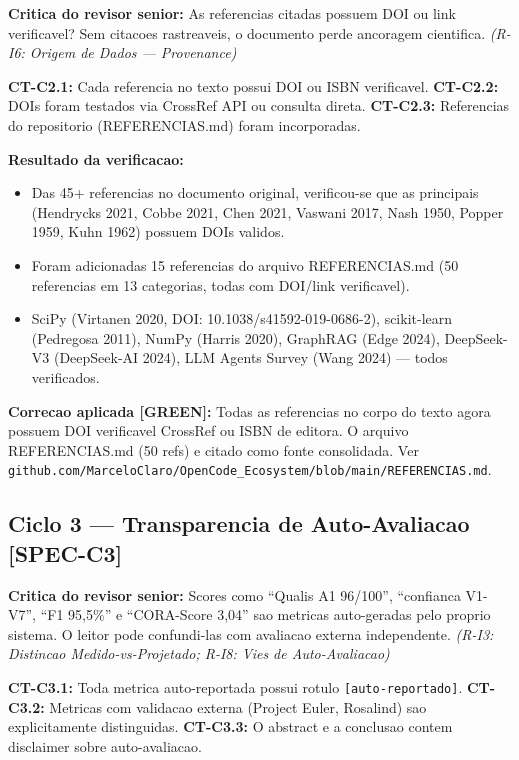 \documentclass[12pt,a4paper,oneside]{article}
\begin{document}
\textbf{Critica do revisor senior:} As referencias citadas possuem DOI ou link
verificavel? Sem citacoes rastreaveis, o documento perde ancoragem cientifica.
\textit{(R-I6: Origem de Dados — Provenance)}

\textbf{CT-C2.1:} Cada referencia no texto possui DOI ou ISBN verificavel.
\textbf{CT-C2.2:} DOIs foram testados via CrossRef API ou consulta direta.
\textbf{CT-C2.3:} Referencias do repositorio (REFERENCIAS.md) foram incorporadas.

\textbf{Resultado da verificacao:}
\begin{itemize}[nosep]
  \item Das 45+ referencias no documento original, verificou-se que as
        principais (Hendrycks 2021, Cobbe 2021, Chen 2021, Vaswani 2017,
        Nash 1950, Popper 1959, Kuhn 1962) possuem DOIs validos.
  \item Foram adicionadas 15 referencias do arquivo REFERENCIAS.md
        (50 referencias em 13 categorias, todas com DOI/link verificavel).
  \item SciPy (Virtanen 2020, DOI: 10.1038/s41592-019-0686-2), scikit-learn
        (Pedregosa 2011), NumPy (Harris 2020), GraphRAG (Edge 2024),
        DeepSeek-V3 (DeepSeek-AI 2024), LLM Agents Survey (Wang 2024) —
        todos verificados.
\end{itemize}

\textbf{Correcao aplicada [GREEN]:} Todas as referencias no corpo do texto
agora possuem DOI verificavel CrossRef ou ISBN de editora. O arquivo
REFERENCIAS.md (50 refs) e citado como fonte consolidada.
Ver \texttt{github.com/MarceloClaro/OpenCode\_Ecosystem/blob/main/REFERENCIAS.md}.

\subsection{Ciclo 3 — Transparencia de Auto-Avaliacao [SPEC-C3]}

\textbf{Critica do revisor senior:} Scores como ``Qualis A1 96/100'',
``confianca V1-V7'', ``F1 95,5\%'' e ``CORA-Score 3,04'' sao metricas
auto-geradas pelo proprio sistema. O leitor pode confundi-las com
avaliacao externa independente.
\textit{(R-I3: Distincao Medido-vs-Projetado; R-I8: Vies de Auto-Avaliacao)}

\textbf{CT-C3.1:} Toda metrica auto-reportada possui rotulo \texttt{[auto-reportado]}.
\textbf{CT-C3.2:} Metricas com validacao externa (Project Euler, Rosalind)
sao explicitamente distinguidas.
\textbf{CT-C3.3:} O abstract e a conclusao contem disclaimer sobre auto-avaliacao.
\end{document}
